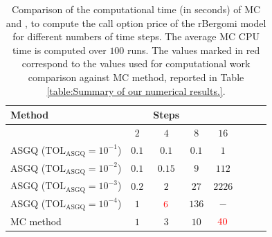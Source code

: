 \FloatBarrier
\begin{table}[h!]
	\centering
	\begin{tabular}{l*{6}{c}r}
	\toprule[1.5pt]
	Method & & Steps  & &     \\
	\hline	
		          & $2$ & $4$ & $8$ & $16$ &   \\
		\hline
		ASGQ ($\text{TOL}_{\text{ASGQ}}=10^{-1}$)  & $0.1$ & $0.1$ & $0.1$ & $1$ \\
		ASGQ ($\text{TOL}_{\text{ASGQ}}=10^{-2}$)  & $0.1$ & $0.15$ & $9$ & $112$ \\
		ASGQ ($\text{TOL}_{\text{ASGQ}}=10^{-3}$)  & $0.2$ & $2$ & $27$ & $2226$ \\
		ASGQ ($\text{TOL}_{\text{ASGQ}}=10^{-4}$)  & $1$ & $\red{6}$ & $136$ & $-$\\
%		
		\hline
		MC method   & $1
		
		$  & $ 3$  & $  10$ & $ \red{40}
		$  \\	
		\bottomrule[1.25pt]
%		
	\end{tabular}
	\caption{Comparison of the computational time (in seconds) of  MC and ,  to compute the call option price of the rBergomi model for different numbers of time steps. The average  MC CPU time is computed over $100$ runs. The values marked in red correspond to the values used for computational work comparison against MC method, reported in Table \ref{table:Summary of our numerical results.}. }
	\label{Comparsion of the computational time of  MC and MISC, used to compute Call option price of rBergomi model for different number of time steps. Case set4}
\end{table}


\FloatBarrier

